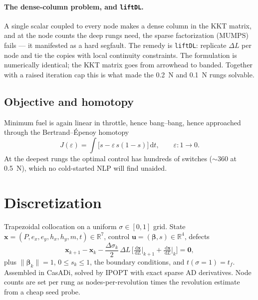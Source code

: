 \documentclass[11pt]{article}
\newcommand{\ud}{\,\mathrm{d}}
\newcommand{\vect}[1]{\bm{#1}}
\begin{document}
\paragraph{The dense-column problem, and \texttt{liftDL}.} A single scalar
coupled to every node makes a dense column in the KKT matrix, and at the node
counts the deep rungs need, the sparse factorization (MUMPS) fails --- it
manifested as a hard segfault. The remedy is \texttt{liftDL}: replicate
$\Delta L$ per node and tie the copies with local continuity constraints. The
formulation is numerically identical; the KKT matrix goes from arrowhead to
banded. Together with a raised iteration cap this is what made the
\SI{0.2}{\newton} and \SI{0.1}{\newton} rungs solvable.

\subsection{Objective and homotopy}

Minimum fuel is again linear in throttle, hence bang--bang, hence approached
through the Bertrand--\'Epenoy homotopy
\begin{equation}
J(\varepsilon)=\int\big[s-\varepsilon\,s(1-s)\big]\ud t,\qquad \varepsilon:1\to0 .
\end{equation}
At the deepest rungs the optimal control has hundreds of switches ($\sim360$ at
\SI{0.5}{\newton}), which no cold-started NLP will find unaided.

\section{Discretization}

Trapezoidal collocation on a uniform $\sigma\in[0,1]$ grid. State
$\vect{x}=(P,e_x,e_y,h_x,h_y,m,t)\in\mathbb{R}^7$, control
$\vect{u}=(\vect{\beta},s)\in\mathbb{R}^4$, defects
\begin{equation}
\vect{x}_{k+1}-\vect{x}_k-\frac{\Delta\sigma_k}{2}\,\Delta L\,
\Big[\tfrac{\ud\vect{x}}{\ud L}\big|_{k+1}+\tfrac{\ud\vect{x}}{\ud L}\big|_{k}\Big]
=\vect{0},
\end{equation}
plus $\|\vect{\beta}_k\|=1$, $0\le s_k\le1$, the boundary conditions, and
$t(\sigma{=}1)=t_f$. Assembled in CasADi, solved by IPOPT with exact sparse AD
derivatives. Node counts are set per rung as nodes-per-revolution times the
revolution estimate from a cheap seed probe.
\end{document}
